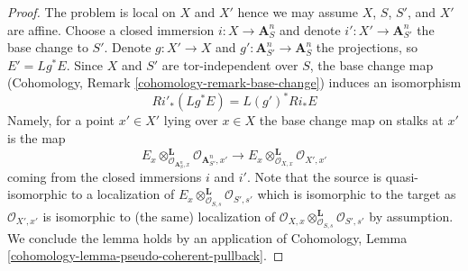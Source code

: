 \documentclass[10pt,a4paper]{amsart}
\theoremstyle{plain}
\theoremstyle{definition}
\theoremstyle{remark}
\numberwithin{equation}{subsection}
\begin{document}
\begin{proof}
The problem is local on $X$ and $X'$ hence we may assume $X$, $S$, $S'$,
and $X'$ are affine. Choose a closed immersion $i : X \to \mathbf{A}^n_S$
and denote $i' : X' \to \mathbf{A}^n_{S'}$ the base change to $S'$.
Denote $g : X' \to X$ and $g' : \mathbf{A}^n_{S'} \to \mathbf{A}^n_S$
the projections, so $E' = Lg^*E$. Since $X$ and $S'$ are tor-independent
over $S$, the base change map
(Cohomology, Remark \ref{cohomology-remark-base-change})
induces an isomorphism
$$
Ri'_*(Lg^*E) = L(g')^*Ri_*E
$$
Namely, for a point $x' \in X'$ lying over $x \in X$ the base change
map on stalks at $x'$ is the map
$$
E_x \otimes_{\mathcal{O}_{\mathbf{A}^n_S, x}}^\mathbf{L}
\mathcal{O}_{\mathbf{A}^n_{S'}, x'}
\longrightarrow
E_x \otimes_{\mathcal{O}_{X, x}}^\mathbf{L}
\mathcal{O}_{X', x'}
$$
coming from the closed immersions $i$ and $i'$. Note that the source
is quasi-isomorphic to a localization of
$E_x \otimes_{\mathcal{O}_{S, s}}^\mathbf{L} \mathcal{O}_{S', s'}$
which is isomorphic to the target as
$\mathcal{O}_{X', x'}$ is isomorphic to (the same) localization of
$\mathcal{O}_{X, x} \otimes_{\mathcal{O}_{S, s}}^\mathbf{L}
\mathcal{O}_{S', s'}$ by assumption. We conclude the lemma holds
by an application of
Cohomology, Lemma \ref{cohomology-lemma-pseudo-coherent-pullback}.
\end{proof}
\end{document}
